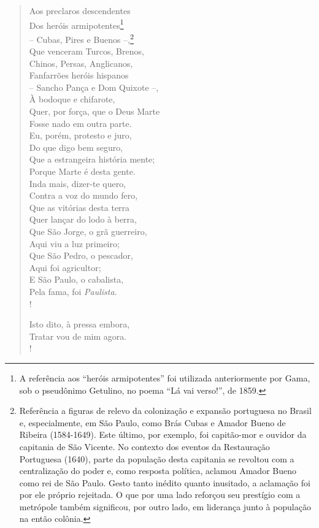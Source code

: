 \begin{verse}
Aos preclaros descendentes\\
Dos heróis armipotentes\footnote{A referência aos ``heróis
  armipotentes'' foi utilizada anteriormente por Gama, sob o pseudônimo
  Getulino, no poema ``Lá vai verso!'', de 1859.}\\
-- Cubas, Pires e Buenos --,\footnote{ Referência a figuras de relevo
  da colonização e expansão portuguesa no Brasil e, especialmente, em
  São Paulo, como Brás Cubas e Amador Bueno de Ribeira (1584-1649). Este
  último, por exemplo, foi capitão-mor e ouvidor da capitania de São
  Vicente. No contexto dos eventos da Restauração Portuguesa (1640),
  parte da população desta capitania se revoltou com a centralização do
  poder e, como resposta política, aclamou Amador Bueno como rei de São
  Paulo. Gesto tanto inédito quanto inusitado, a aclamação foi por ele
  próprio rejeitada. O que por uma lado reforçou seu prestígio com a
  metrópole também significou, por outro lado, em liderança junto à
  população na então colônia.}\\
Que venceram Turcos, Brenos,\\
Chinos, Persas, Anglicanos,\\
Fanfarrões heróis hispanos\\
-- Sancho Pança e Dom Quixote --,\\
À bodoque e chifarote,\\
Quer, por força, que o Deus Marte\\
Fosse nado em outra parte.\\
Eu, porém, protesto e juro,\\
Do que digo bem seguro,\\
Que a estrangeira história mente;\\
Porque Marte é desta gente.\\
Inda mais, dizer-te quero,\\
Contra a voz do mundo fero,\\
Que as vitórias desta terra\\
Quer lançar do lodo à berra,\\
Que São Jorge, o grã guerreiro,\\
Aqui viu a luz primeiro;\\
Que São Pedro, o pescador,\\
Aqui foi agricultor;\\
E São Paulo, o cabalista,\\
Pela fama, foi \emph{Paulista}.\\!

Isto dito, à pressa embora,\\
Tratar vou de mim agora.\\!


\end{verse}
